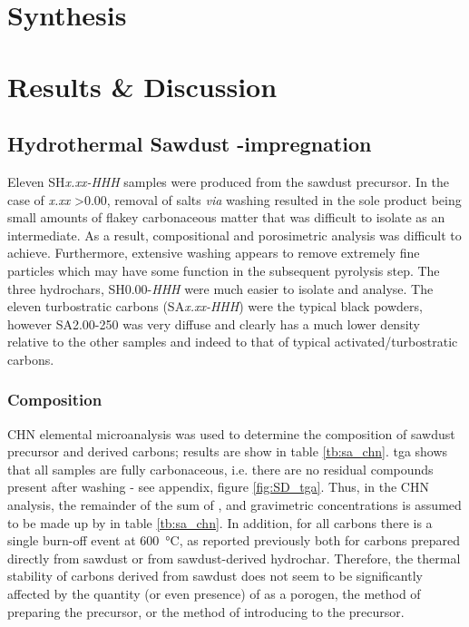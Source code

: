 \newpage

\section{Synthesis}

\section{Results \& Discussion}
\subsection[Hydrothermal Sawdust KOH-impregnation]{Hydrothermal Sawdust -impregnation}
\label{ss:sd_results}

Eleven SH\textit{x.xx-HHH} samples were produced from the sawdust precursor. In the case of \textit{x.xx} \num{>0.00}, removal of  salts \textit{via} washing resulted in the sole product being small amounts of flakey carbonaceous matter that was difficult to isolate as an intermediate. As a result, compositional and porosimetric analysis was difficult to achieve. Furthermore, extensive washing appears to remove extremely fine particles which may have some function in the subsequent pyrolysis step. The three \glspl{hydrochar}, SH0.00-\textit{HHH} were much easier to isolate and analyse. The eleven \glspl{turbostratic carbon} (SA\textit{x.xx-HHH}) were the typical black powders, however SA2.00-250 was very diffuse and clearly has a much lower density relative to the other samples and indeed to that of typical activated/\glspl{turbostratic carbon}.

\subsubsection{Composition}

CHN elemental microanalysis was used to determine the composition of sawdust precursor and derived carbons; results are show in table \ref{tb:sa_chn}. \acrshort{tga} shows that all samples are fully carbonaceous, i.e. there are no residual  compounds present after washing - see appendix, figure \ref{fig:SD_tga}. Thus, in the CHN analysis, the remainder of the sum of ,  and  gravimetric concentrations is assumed to be made up by  in table \ref{tb:sa_chn}. In addition, for all carbons there is a single burn-off event at \qty{600}{\degreeCelsius}, as reported previously both for carbons prepared directly from sawdust or from sawdust-derived \gls{hydrochar}.\citep{Balahmar2017Biomass} Therefore, the thermal stability of carbons derived from sawdust does not seem to be significantly affected by the quantity (or even presence) of  as a \gls{porogen}, the method of preparing the precursor, or the method of introducing  to the precursor.

